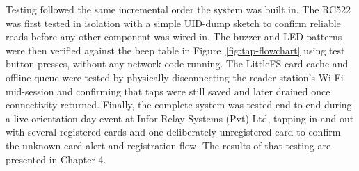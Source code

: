 Testing followed the same incremental order the system was built in. The RC522 was first tested in isolation with a simple UID-dump sketch to confirm reliable reads before any other component was wired in. The buzzer and LED patterns were then verified against the beep table in Figure~\ref{fig:tap-flowchart} using test button presses, without any network code running. The LittleFS card cache and offline queue were tested by physically disconnecting the reader station's Wi-Fi mid-session and confirming that taps were still saved and later drained once connectivity returned. Finally, the complete system was tested end-to-end during a live orientation-day event at Infor Relay Systems (Pvt) Ltd, tapping in and out with several registered cards and one deliberately unregistered card to confirm the unknown-card alert and registration flow. The results of that testing are presented in Chapter 4.
